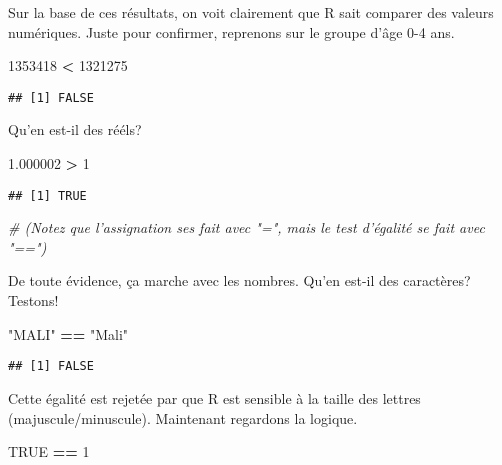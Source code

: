 \documentclass[]{book}
\newenvironment{Shaded}{\begin{snugshade}}{\end{snugshade}}
\newcommand{\DecValTok}[1]{\textcolor[rgb]{0.00,0.00,0.81}{#1}}
\newcommand{\FloatTok}[1]{\textcolor[rgb]{0.00,0.00,0.81}{#1}}
\newcommand{\StringTok}[1]{\textcolor[rgb]{0.31,0.60,0.02}{#1}}
\newcommand{\CommentTok}[1]{\textcolor[rgb]{0.56,0.35,0.01}{\textit{#1}}}
\newcommand{\OtherTok}[1]{\textcolor[rgb]{0.56,0.35,0.01}{#1}}
\newcommand{\OperatorTok}[1]{\textcolor[rgb]{0.81,0.36,0.00}{\textbf{#1}}}
\begin{document}
Sur la base de ces résultats, on voit clairement que R sait comparer des
valeurs numériques. Juste pour confirmer, reprenons sur le groupe d'âge
0-4 ans.

\begin{Shaded}
\begin{Highlighting}[]
\DecValTok{1353418} \OperatorTok{<}\StringTok{ }\DecValTok{1321275}
\end{Highlighting}
\end{Shaded}

\begin{verbatim}
## [1] FALSE
\end{verbatim}

Qu'en est-il des rééls?

\begin{Shaded}
\begin{Highlighting}[]
\FloatTok{1.000002} \OperatorTok{>}\StringTok{ }\DecValTok{1} 
\end{Highlighting}
\end{Shaded}

\begin{verbatim}
## [1] TRUE
\end{verbatim}

\begin{Shaded}
\begin{Highlighting}[]
\CommentTok{# (Notez que l'assignation ses fait avec "=", mais le test d'égalité se fait avec "==")}
\end{Highlighting}
\end{Shaded}

De toute évidence, ça marche avec les nombres. Qu'en est-il des
caractères? Testons!

\begin{Shaded}
\begin{Highlighting}[]
\StringTok{"MALI"} \OperatorTok{==}\StringTok{ "Mali"}
\end{Highlighting}
\end{Shaded}

\begin{verbatim}
## [1] FALSE
\end{verbatim}

Cette égalité est rejetée par que R est sensible à la taille des lettres
(majuscule/minuscule). Maintenant regardons la logique.

\begin{Shaded}
\begin{Highlighting}[]
\OtherTok{TRUE} \OperatorTok{==}\StringTok{ }\DecValTok{1}
\end{Highlighting}
\end{Shaded}
\end{document}
